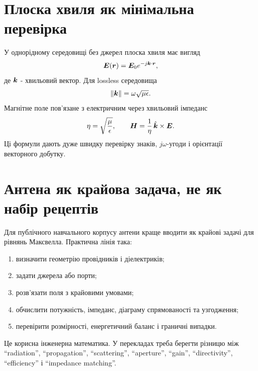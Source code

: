 \section{Плоска хвиля як мінімальна перевірка}

У однорідному середовищі без джерел плоска хвиля має вигляд
\begin{equation}
  \bm{E}(\bm{r}) = \bm{E}_0 e^{-j\bm{k}\cdot\bm{r}},
\end{equation}
де $\bm{k}$ - хвильовий вектор. Для lossless середовища
\begin{equation}
  \lVert \bm{k}\rVert = \omega\sqrt{\mu\epsilon}.
\end{equation}
Магнітне поле пов'язане з електричним через хвильовий імпеданс
\begin{equation}
  \eta = \sqrt{\frac{\mu}{\epsilon}}, \qquad
  \bm{H} = \frac{1}{\eta}\,\hat{\bm{k}}\times\bm{E}.
\end{equation}
Ці формули дають дуже швидку перевірку знаків, $j\omega$-угоди і орієнтації векторного добутку.

\section{Антена як крайова задача, не як набір рецептів}

Для публічного навчального корпусу антени краще вводити як крайові задачі для рівнянь Максвелла. Практична лінія така:
\begin{enumerate}[label=\arabic*.]
\item визначити геометрію провідників і діелектриків;
\item задати джерела або порти;
\item розв'язати поля з крайовими умовами;
\item обчислити потужність, імпеданс, діаграму спрямованості та узгодження;
\item перевірити розмірності, енергетичний баланс і граничні випадки.
\end{enumerate}

Це корисна інженерна математика. У перекладах треба берегти різницю між ``radiation'', ``propagation'', ``scattering'', ``aperture'', ``gain'', ``directivity'', ``efficiency'' і ``impedance matching''.
